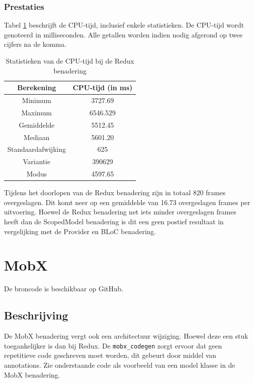 \subsubsection{Prestaties}
Tabel \ref{table:experiment-redux-statistics} beschrijft de CPU-tijd, inclusief enkele statistieken. De CPU-tijd wordt genoteerd in milliseconden. Alle getallen worden indien nodig afgerond op twee cijfers na de komma.
\begin{table}[H]
    \centering
    \begin{tabular}{c|c}
        \textbf{Berekening} & \textbf{CPU-tijd (in ms)} \\ \hline
        Minimum             & 3727.69                   \\ \hline
        Maximum             & 6546.529                  \\ \hline
        Gemiddelde          & 5512.45                   \\ \hline
        Mediaan             & 5601.20                   \\ \hline
        Standaardafwijking  & 625                       \\ \hline
        Variantie           & 390629                    \\ \hline
        Modus               & 4597.65                      \\                
    \end{tabular}
    \caption{Statistieken van de CPU-tijd bij de Redux benadering}
    \label{table:experiment-redux-statistics}
\end{table}

Tijdens het doorlopen van de Redux benadering zijn in totaal 820 frames overgeslagen. Dit komt neer op een gemiddelde van 16.73 overgeslagen frames per uitvoering. Hoewel de Redux benadering net iets minder overgeslagen frames heeft dan de ScopedModel benadering is dit een geen postief resultaat in vergelijking met de Provider en BLoC benadering.

\section{MobX}
De broncode is beschikbaar op GitHub. \autocite{DeVrient2019e}
\subsection{Beschrijving}
De MobX benadering vergt ook een architectuur wijziging. Hoewel deze een stuk toegankelijker is dan bij Redux. De \verb|mobx_codegen| zorgt ervoor dat geen repetitieve code geschreven moet worden, dit gebeurt door middel van annotations. Zie onderstaande code als voorbeeld van een model klasse in de MobX benadering.

